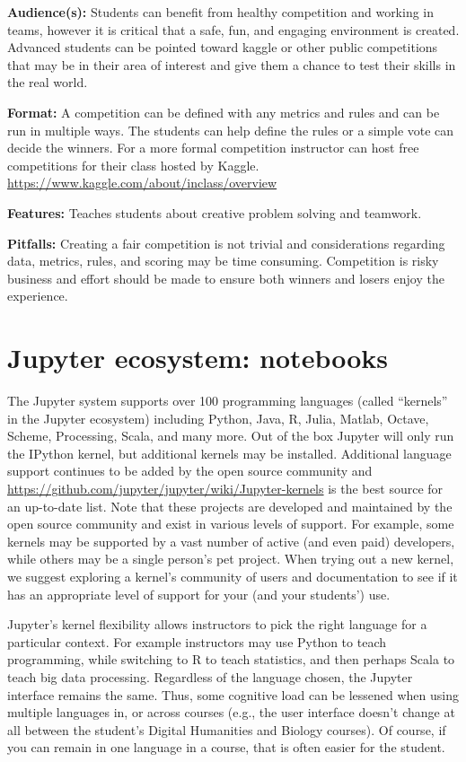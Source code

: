 \documentclass[]{book}
\begin{document}
\textbf{Audience(s):} Students can benefit from healthy competition and
working in teams, however it is critical that a safe, fun, and engaging
environment is created. Advanced students can be pointed toward kaggle
or other public competitions that may be in their area of interest and
give them a chance to test their skills in the real world.

\textbf{Format:} A competition can be defined with any metrics and rules
and can be run in multiple ways. The students can help define the rules
or a simple vote can decide the winners. For a more formal competition
instructor can host free competitions for their class hosted by Kaggle.
\url{https://www.kaggle.com/about/inclass/overview}

\textbf{Features:} Teaches students about creative problem solving and
teamwork.

\textbf{Pitfalls:} Creating a fair competition is not trivial and
considerations regarding data, metrics, rules, and scoring may be time
consuming. Competition is risky business and effort should be made to
ensure both winners and losers enjoy the experience.

\hypertarget{jupyter}{\chapter{Jupyter ecosystem:
notebooks}\label{jupyter}}

The Jupyter system supports over 100 programming languages (called
``kernels'' in the Jupyter ecosystem) including Python, Java, R, Julia,
Matlab, Octave, Scheme, Processing, Scala, and many more. Out of the box
Jupyter will only run the IPython kernel, but additional kernels may be
installed. Additional language support continues to be added by the open
source community and
\url{https://github.com/jupyter/jupyter/wiki/Jupyter-kernels} is the
best source for an up-to-date list. Note that these projects are
developed and maintained by the open source community and exist in
various levels of support. For example, some kernels may be supported by
a vast number of active (and even paid) developers, while others may be
a single person's pet project. When trying out a new kernel, we suggest
exploring a kernel's community of users and documentation to see if it
has an appropriate level of support for your (and your students') use.

Jupyter's kernel flexibility allows instructors to pick the right
language for a particular context. For example instructors may use
Python to teach programming, while switching to R to teach statistics,
and then perhaps Scala to teach big data processing. Regardless of the
language chosen, the Jupyter interface remains the same. Thus, some
cognitive load can be lessened when using multiple languages in, or
across courses (e.g., the user interface doesn't change at all between
the student's Digital Humanities and Biology courses). Of course, if you
can remain in one language in a course, that is often easier for the
student.
\end{document}
